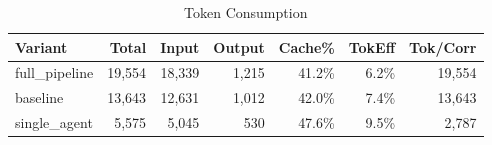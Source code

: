 \begin{table}[htbp]
\centering
\caption{Token Consumption}
\label{tab:tokens}
\begin{tabular}{l rrrr rr}
\toprule
Variant & Total & Input & Output & Cache\% & TokEff & Tok/Corr \\
\midrule
  full\_pipeline & 19,554 & 18,339 & 1,215 & 41.2\% & 6.2\% & 19,554 \\
  baseline & 13,643 & 12,631 & 1,012 & 42.0\% & 7.4\% & 13,643 \\
  single\_agent & 5,575 & 5,045 & 530 & 47.6\% & 9.5\% & 2,787 \\
\bottomrule
\end{tabular}
\end{table}
